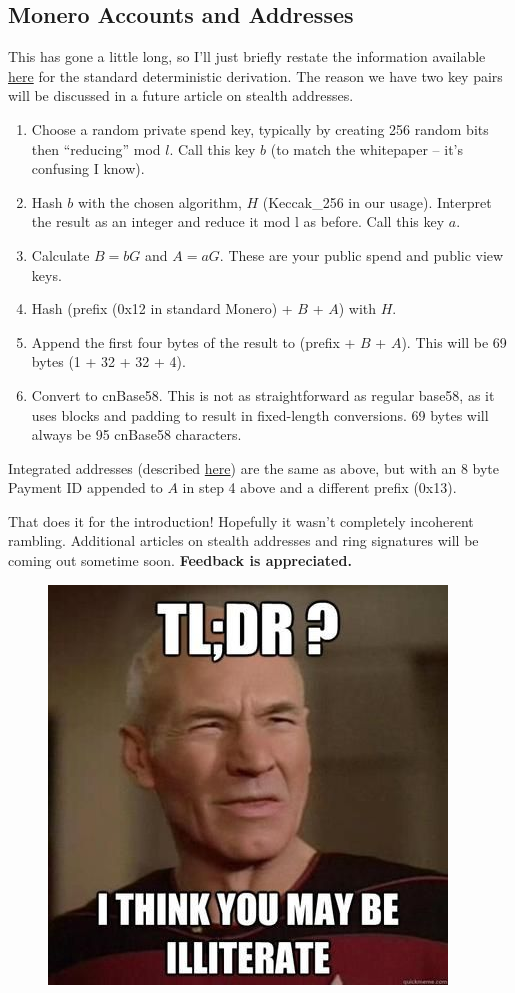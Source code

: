 \subsection{Monero Accounts and Addresses}
This has gone a little long, so I'll just briefly restate the information available \href{https://xmr.llcoins.net/addresstests.html}{here} for the standard deterministic derivation. The reason we have two key pairs will be discussed in a future article on stealth addresses.
	\begin{enumerate}
		\item Choose a random private spend key, typically by creating 256 random bits then ``reducing'' mod \(l\). Call this key \(b\) (to match the whitepaper -- it's confusing I know).
		\item Hash \(b\) with the chosen algorithm, \(H\) (Keccak\_256 in our usage). Interpret the result as an integer and reduce it mod l as before. Call this key \(a\).
		\item Calculate \(B = bG\) and \(A = aG\). These are your public spend and public view keys.
		\item Hash (prefix (0x12 in standard Monero) + \(B\) + \(A\)) with \(H\).
		\item Append the first four bytes of the result to (prefix + \(B\) + \(A\)). This will be 69 bytes (1 + 32 + 32 + 4).
		\item Convert to cnBase58. This is not as straightforward as regular base58, as it uses blocks and padding to result in fixed-length conversions. 69 bytes will always be 95 cnBase58 characters.
	\end{enumerate}
	Integrated addresses (described \href{http://pastebin.com/bp5RKXuC}{here}) are the same as above, but with an 8 byte Payment ID appended to \(A\) in step 4 above and a different prefix (0x13).

	That does it for the introduction! Hopefully it wasn't completely incoherent rambling. Additional articles on stealth addresses and ring signatures will be coming out sometime soon. \textbf{Feedback is appreciated.}

\begin{figure}[H]
	\centering
	\includegraphics[width=0.5\linewidth]{./images/blog-series/xmr-crypto-luigi1111/TLDR.jpg}
\end{figure}

